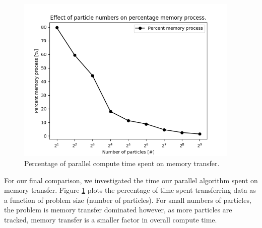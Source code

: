 \begin{figure}[]
 \begin{centering}
 \centering
 \includegraphics[width=0.6\linewidth,height=8cm]{../figs/memory.png}
 \caption{Percentage of parallel compute time spent on memory transfer.}
 \label{memory}
 \end{centering}
\end{figure}

For our final comparison, we investigated the time our parallel algorithm spent
on memory transfer. Figure \ref{memory} plots the percentage of time spent
transferring data as a function of problem size  (number of particles). For
small numbers of particles, the problem is memory transfer dominated however,
as more particles are tracked, memory transfer is a smaller factor in overall
compute time.


